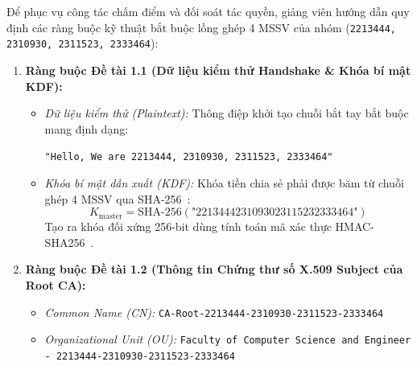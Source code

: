 \documentclass[a4paper,12pt]{article}
\begin{document}
Để phục vụ công tác chấm điểm và đối soát tác quyền, giảng viên hướng dẫn quy định các ràng buộc kỹ thuật bắt buộc lồng ghép 4 MSSV của nhóm (\texttt{2213444, 2310930, 2311523, 2333464}):
\begin{enumerate}
    \item \textbf{Ràng buộc Đề tài 1.1 (Dữ liệu kiểm thử Handshake \& Khóa bí mật KDF):}
    \begin{itemize}
        \item \textit{Dữ liệu kiểm thử (Plaintext):} Thông điệp khởi tạo chuỗi bắt tay bắt buộc mang định dạng:
        \begin{center}
        \texttt{"Hello, We are 2213444, 2310930, 2311523, 2333464"}
        \end{center}
        \item \textit{Khóa bí mật dẫn xuất (KDF):} Khóa tiền chia sẻ phải được băm từ chuỗi ghép 4 MSSV qua SHA-256~\cite{fips1804}:
        \begin{equation}
            K_{\text{master}} = \text{SHA-256}(\text{"2213444231093023115232333464"})
        \end{equation}
        Tạo ra khóa đối xứng 256-bit dùng tính toán mã xác thực HMAC-SHA256~\cite{fips1981}.
    \end{itemize}
    \item \textbf{Ràng buộc Đề tài 1.2 (Thông tin Chứng thư số X.509 Subject của Root CA):}
    \begin{itemize}
        \item \textit{Common Name (CN):} \texttt{CA-Root-2213444-2310930-2311523-2333464}
        \item \textit{Organizational Unit (OU):} \texttt{Faculty of Computer Science and Engineer - 2213444-2310930-2311523-2333464}
    \end{itemize}
\end{enumerate}
\end{document}
